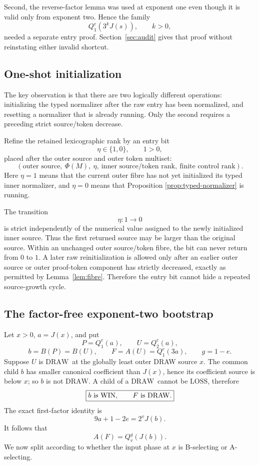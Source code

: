 \documentclass[11pt]{article}
\newcommand{\WIN}{\ensuremath{\mathrm{WIN}}}
\newcommand{\LOSS}{\ensuremath{\mathrm{LOSS}}}
\newcommand{\DRAW}{\ensuremath{\mathrm{DRAW}}}
\newcommand{\PhiM}{\Phi}
\begin{document}
Second, the reverse-factor lemma was used at exponent one even though it is
valid only from exponent two. Hence the family
\[
 Q_1^e(3^kJ(s)),\qquad k>0,
\]
needed a separate entry proof. Section~\ref{sec:audit} gives that proof
without reinstating either invalid shortcut.

\subsection{One-shot initialization}

The key observation is that there are two logically different operations:
initializing the typed normalizer after the raw entry has been normalized,
and resetting a normalizer that is already running. Only the second requires
a preceding strict source/token decrease.

Refine the retained lexicographic rank by an entry bit
\[
 \eta\in\{1,0\},\qquad 1>0,
\]
placed after the outer source and outer token multiset:
\[
 \boxed{
 (\text{outer source},\ \PhiM(M),\ \eta,\
   \text{inner source/token rank},\ \text{finite control rank}).}
\]
Here $\eta=1$ means that the current outer fibre has not yet initialized its
typed inner normalizer, and $\eta=0$ means that Proposition
\ref{prop:typed-normalizer} is running.

The transition
\[
 \boxed{\eta:1\longrightarrow0}
\]
is strict independently of the numerical value assigned to the newly
initialized inner source. Thus the first returned source may be larger than
the original source. Within an unchanged outer source/token fibre, the bit can
never return from $0$ to $1$. A later raw reinitialization is allowed only
after an earlier outer source or outer proof-token component has strictly
decreased, exactly as permitted by Lemma~\ref{lem:fibre}. Therefore the entry
bit cannot hide a repeated source-growth cycle.

\subsection{The factor-free exponent-two bootstrap}

Let $x>0$, $a=J(x)$, and put
\[
 P=Q_1^e(a),\qquad U=Q_2^e(a),
\]
\[
 b=B(P)=B(U),\qquad F=A(U)=Q_1^e(3a),\qquad g=1-e.
\]
Suppose $U$ is \DRAW\ at the globally least outer DRAW source $x$. The common
child $b$ has smaller canonical coefficient than $J(x)$, hence its coefficient
source is below $x$; so $b$ is not \DRAW. A child of a \DRAW\ cannot be
\LOSS, therefore
\[
 \boxed{b\text{ is \WIN},\qquad F\text{ is \DRAW}.}
\]
The exact first-factor identity is
\[
 \boxed{9a+1-2e=2^vJ(b)}.
\]
It follows that
\[
 A(F)=Q_v^g(J(b)).
\]
We now split according to whether the input phase at $x$ is B-selecting or
A-selecting.
\end{document}
